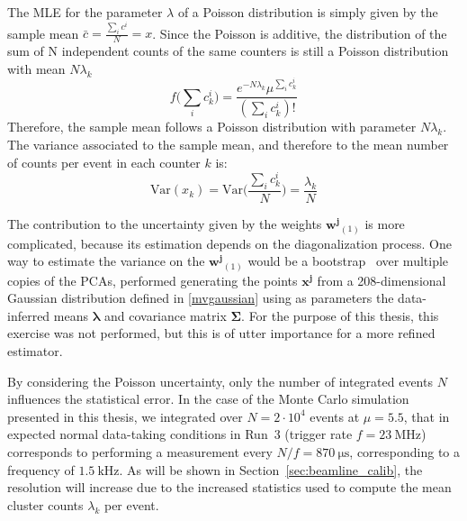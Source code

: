 The MLE for the parameter $\lambda$ of a Poisson distribution is simply given by the sample mean $\bar{c}=\frac{\sum_i c^i}{N}=x$. 
 Since the Poisson is additive, the distribution of the sum of N independent counts of the same counters is still a Poisson distribution with mean $N\lambda_k$
 \begin{equation}
     f\bigl(\sum_i c^i_k\bigr) = \frac{e^{-N\lambda_k} \mu^{\sum_i c^i_k}}{(\sum_i c^i_k)!}
 \end{equation}
Therefore, the sample mean follows a Poisson distribution with parameter $N\lambda_k$. The variance associated to the sample mean, and therefore to the mean number of counts per event in each counter $k$ is:
\begin{equation}
    \text{Var}(x_k) =\text{Var}\biggl(\frac{\sum_i c^i_k}{N}\biggr) = \frac{\lambda_k}{N}
\end{equation}

The contribution to the uncertainty given by the weights $\mathbf{w^j}_{(1)}$ is more complicated, because its estimation depends on the diagonalization process. One way to estimate the variance on the $\mathbf{w^j}_{(1)}$ would be a  bootstrap~\cite{10.1214/aos/1176344552} over multiple copies of the PCAs, performed generating the points $\mathbf{x^{j}}$ from a 208-dimensional Gaussian distribution defined in \eqref{mvgaussian} using as parameters the data-inferred means $\mathbf{\lambda}$ and covariance matrix $\mathbf{\Sigma}$.  For the purpose of this thesis, this exercise was not performed, but this is of utter importance for a more refined estimator.

By considering the Poisson uncertainty, only the number of integrated events $N$ influences the statistical error. In the case of the Monte Carlo simulation presented in this thesis, we integrated over $N=2\cdot10^{4}$ events at $\mu=5.5$, that in expected normal data-taking conditions in Run~3 (trigger rate $f=\SI{23}{\mega\hertz}$) corresponds to performing a measurement every $N/f=\SI{870}{\micro\second}$, corresponding to a frequency of $\SI{1.5}{\kilo\hertz}$. As will be shown in Section~\ref{sec:beamline_calib}, the resolution will increase due to the increased statistics used to compute the mean cluster counts $\lambda_k$ per event.

